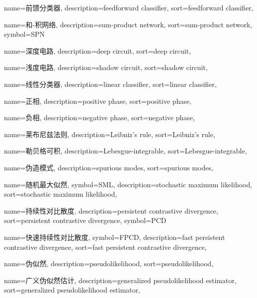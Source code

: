 {
  name=前馈分类器,
  description={feedforward classifier},
  sort={feedforward classifier},
}

{
   name=和-积网络,
   description={sum-product network},
   sort={sum-product network},
   symbol={SPN}
}

{
  name=深度电路,
  description={deep circuit},
  sort={deep circuit},
}

{
  name=浅度电路,
  description={shadow circuit},
  sort={shadow circuit},
}

{
  name=线性分类器,
  description={linear classifier},
  sort={linear classifier},
}

{
  name=正相,
  description={positive phase},
  sort={positive phase},
}

{
  name=负相,
  description={negative phase},
  sort={negative phase},
}

{
  name=莱布尼兹法则,
  description={Leibniz's rule},
  sort={Leibniz's rule},
}

{
  name=勒贝格可积,
  description={Lebesgue-integrable},
  sort={Lebesgue-integrable},
}

{
  name=伪造模式,
  description={spurious modes},
  sort={spurious modes},
}

{
  name=随机最大似然,
  symbol={SML},
  description={stochastic maximum likelihood},
  sort={stochastic maximum likelihood},
}

{
  name=持续性对比散度,
  description={persistent contrastive divergence},
  sort={persistent contrastive divergence},
  symbol={PCD}
}

{
  name=快速持续性对比散度,
  symbol={FPCD},
  description={fast persistent contrastive divergence},
  sort={fast persistent contrastive divergence},
}

{
  name=伪似然,
  description={pseudolikelihood},
  sort={pseudolikelihood},
}

{
  name=广义伪似然估计,
  description={generalized pseudolikelihood estimator},
  sort={generalized pseudolikelihood estimator},
}

